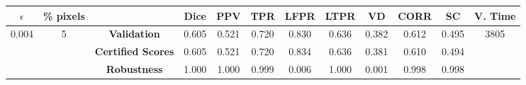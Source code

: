 \begin{longtable}{ c  c | c | c  c  c  c  c  c  c c c}
\toprule \textbf{$\epsilon$} & \textbf{\% pixels} & & \textbf{Dice} & \textbf{PPV} & \textbf{TPR} & \textbf{LFPR} & \textbf{LTPR} & \textbf{VD} & \textbf{CORR} & \textbf{SC} & \textbf{V. Time} \\
\midrule 
\multirow{3}{*}{0.004}  & \multirow{3}{*}{5} &\textbf{Validation} & 0.605 & 0.521 & 0.720 & 0.830 & 0.636 & 0.382 & 0.612 & 0.495 & \multirow{3}{*}{3805} \\
 & & \textbf{Certified Scores} & 0.605 & 0.521 & 0.720 & 0.834 & 0.636 & 0.381 & 0.610 & 0.494 & \\
& & \textbf{Robustness} & 1.000 & 1.000 & 0.999 & 0.006 & 1.000 & 0.001 & 0.998 & 0.998 & \\
\end{longtable}